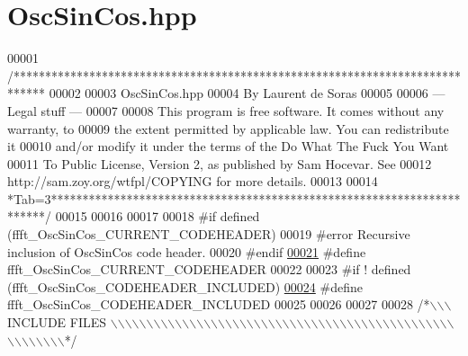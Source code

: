 \hypertarget{a00112_source}{\section{Osc\+Sin\+Cos.\+hpp}
\label{a00112_source}
}

\begin{DoxyCode}
00001 \textcolor{comment}{/*****************************************************************************}
00002 \textcolor{comment}{}
00003 \textcolor{comment}{        OscSinCos.hpp}
00004 \textcolor{comment}{        By Laurent de Soras}
00005 \textcolor{comment}{}
00006 \textcolor{comment}{--- Legal stuff ---}
00007 \textcolor{comment}{}
00008 \textcolor{comment}{This program is free software. It comes without any warranty, to}
00009 \textcolor{comment}{the extent permitted by applicable law. You can redistribute it}
00010 \textcolor{comment}{and/or modify it under the terms of the Do What The Fuck You Want}
00011 \textcolor{comment}{To Public License, Version 2, as published by Sam Hocevar. See}
00012 \textcolor{comment}{http://sam.zoy.org/wtfpl/COPYING for more details.}
00013 \textcolor{comment}{}
00014 \textcolor{comment}{*Tab=3***********************************************************************/}
00015 
00016 
00017 
00018 \textcolor{preprocessor}{#if defined (ffft\_OscSinCos\_CURRENT\_CODEHEADER)}
00019 \textcolor{preprocessor}{    #error Recursive inclusion of OscSinCos code header.}
00020 \textcolor{preprocessor}{#endif}
\hypertarget{a00112_source_l00021}{}\hyperlink{a00112_a494ff2306ae58e9421db77eb15781a51}{00021} \textcolor{preprocessor}{#define ffft\_OscSinCos\_CURRENT\_CODEHEADER}
00022 
00023 \textcolor{preprocessor}{#if ! defined (ffft\_OscSinCos\_CODEHEADER\_INCLUDED)}
\hypertarget{a00112_source_l00024}{}\hyperlink{a00112_ae01440666959e9c8b8737183e8a5b3ef}{00024} \textcolor{preprocessor}{#define ffft\_OscSinCos\_CODEHEADER\_INCLUDED}
00025 
00026 
00027 
00028 \textcolor{comment}{/*\(\backslash\)\(\backslash\)\(\backslash\) INCLUDE FILES \(\backslash\)\(\backslash\)\(\backslash\)\(\backslash\)\(\backslash\)\(\backslash\)\(\backslash\)\(\backslash\)\(\backslash\)\(\backslash\)\(\backslash\)\(\backslash\)\(\backslash\)\(\backslash\)\(\backslash\)\(\backslash\)\(\backslash\)\(\backslash\)\(\backslash\)\(\backslash\)\(\backslash\)\(\backslash\)\(\backslash\)\(\backslash\)\(\backslash\)\(\backslash\)\(\backslash\)\(\backslash\)\(\backslash\)\(\backslash\)\(\backslash\)\(\backslash\)\(\backslash\)\(\backslash\)\(\backslash\)\(\backslash\)\(\backslash\)\(\backslash\)\(\backslash\)\(\backslash\)\(\backslash\)\(\backslash\)\(\backslash\)\(\backslash\)\(\backslash\)\(\backslash\)\(\backslash\)\(\backslash\)\(\backslash\)\(\backslash\)\(\backslash\)\(\backslash\)\(\backslash\)\(\backslash\)\(\backslash\)\(\backslash\)*/}

\end{DoxyCode}
